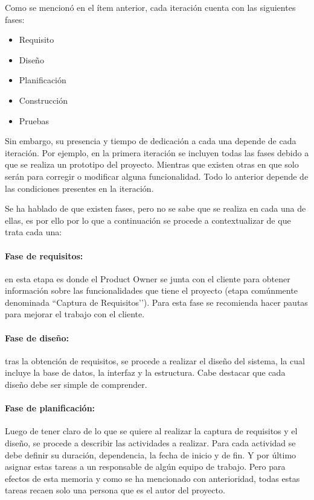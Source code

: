 Como se mencionó en el ítem anterior, cada iteración cuenta con las siguientes fases:

\begin{itemize}
    \item Requisito
    \item Diseño
    \item Planificación
    \item Construcción
    \item Pruebas
\end{itemize}

Sin embargo, su presencia y tiempo de dedicación a cada una depende de cada iteración. Por ejemplo, en la primera iteración se incluyen todas las fases debido a que se realiza un prototipo del proyecto. Mientras que existen otras en que solo serán para corregir o modificar alguna funcionalidad. Todo lo anterior depende de las condiciones presentes en la iteración.

Se ha hablado de que existen fases, pero no se sabe que se realiza en cada una de ellas, es por ello por lo que a continuación se procede a contextualizar de que trata cada una:

\paragraph{Fase de requisitos: } en esta etapa es donde el Product Owner se junta con el cliente para obtener información sobre las funcionalidades que tiene el proyecto (etapa comúnmente denominada ``Captura de Requisitos’’). Para esta fase se recomienda hacer pautas para mejorar el trabajo con el cliente.

\paragraph{Fase de diseño: } tras la obtención de requisitos, se procede a realizar el diseño del sistema, la cual incluye la base de datos, la interfaz y la estructura. Cabe destacar que cada diseño debe ser simple de comprender.

\paragraph{Fase de planificación: } Luego de tener claro de lo que se quiere al realizar la captura de requisitos y el diseño, se procede a describir las actividades a realizar. Para cada actividad se debe definir su duración, dependencia, la fecha de inicio y de fin. Y por último asignar estas tareas a un responsable de algún equipo de trabajo. Pero para efectos de esta memoria y como se ha mencionado con anterioridad, todas estas tareas recaen solo una persona que es el autor del proyecto.

